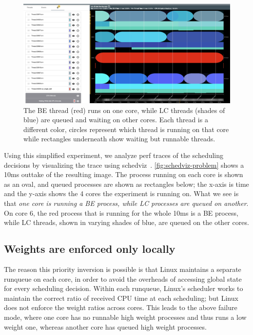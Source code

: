 \begin{figure}[t]
    \centering
    \includegraphics[width=\columnwidth]{graphs/schedviz-problem.png}
    \caption{The BE thread (red) runs on one core, while LC threads (shades of
    blue) are queued and waiting on other cores. Each thread is a different
    color, circles represent which thread is running on that core while
    rectangles underneath show waiting but runnable threads.
    }\label{fig:schedviz-problem}
\end{figure}

Using this simplified experiment, we analyze perf traces of the scheduling
decisions by visualizing the trace using schedviz~\cite{schedviz-tool}.
\autoref{fig:schedviz-problem} shows a 10ms outtake of the resulting image. The
process running on each core is shown as an oval, and queued processes are shown
as rectangles below; the x-axis is time and the y-axis shows the 4 cores the
experiment is running on. What we see is that \textit{one core is running a BE
process, while LC processes are queued on another}. On core 6, the red process
that is running for the whole 10ms is a BE process, while LC threads, shown in
varying shades of blue, are queued on the other cores.

\subsection{Weights are enforced only locally}\label{ss:problem:weights-local}

The reason this priority inversion is possible is that Linux maintains a
separate runqueue on each core, in order to avoid the overheads of accessing
global state for every scheduling decision. Within each runqueue, Linux's
scheduler works to maintain the correct ratio of received CPU time at each
scheduling; but Linux does not enforce the weight ratios across cores. This
leads to the above failure mode, where one core has no runnable high weight
processes and thus runs a low weight one, whereas another core has queued high
weight processes.

